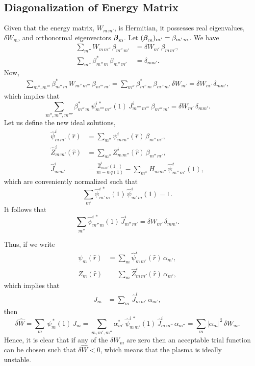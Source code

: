 \documentclass[12pt,prb,aps,notitlepage]{revtex4-1}
\newcommand{\bbeta}{\mbox{\boldmath$\beta$}}
\begin{document}
\subsection{Diagonalization of Energy Matrix}
Given that the energy matrix, $W_{m\,m'}$, is Hermitian, it possesses real eigenvalues, $\delta W_m$, and orthonormal
eigenvectors $\bbeta_m$. Let $(\bbeta_m)_{m'} = \beta_{m'\,m}$. 
We have
\begin{align}
\sum_{m''} W_{m\,m''}\,\beta_{m''\,m'} &= \delta W_{m'}\,\beta_{m\,m'},\\[0.5ex]
\sum_{m''} \beta_{m''\,m}^\ast\,\beta_{m''\,m'} &= \delta_{mm'}.
\end{align}
Now,
\begin{align}
\sum_{m'',m'''}\beta^\ast_{m''\,m}\,W_{m''\,m'''}\,\beta_{m'''\,m'} = \sum_{m''} \beta^\ast_{m''\,m}\,\beta_{m''\,m'}\,\delta W_{m'}=\delta W_{m'}\,\delta_{mm'},
\end{align}
which implies that 
\begin{equation}
\sum_{m'',m''',m''''}\beta^\ast_{m''\,m}\,\psi^{i\,\ast}_{m''''\,m''}(1)\,J^i_{m''''\,m'''}\,\beta_{m'''\,m'} = \delta W_{m'}\,\delta_{mm'}.
\end{equation}
Let us define the new ideal solutions, 
\begin{align}
\hat{\psi}^i_{m\,m'}(\hat{r}) &= \sum_{m''}\psi^i_{m\,m''}(\hat{r})\,\beta_{m''\,m'},\\[0.5ex]
\hat{Z}^i_{m\,m'}(\hat{r}) &= \sum_{m''}Z^i_{m\,m''}(\hat{r})\,\beta_{m''\,m'},\\[0.5ex]
\hat{J}^i_{m\,m'} &=  \frac{\hat{Z}_{m\,m'}^i(1_-)}{m-n\,q(1)}-\sum_{m''} H_{m\,m''}\,\hat{\psi}_{m''\,m'}^i(1),
\end{align}
which are conveniently normalized such that 
\begin{equation}
\sum_{m'}\hat{\psi}_{m'\,m}^{i\,\ast}(1)\,\hat{\psi}_{m'\,m}^i(1) = 1.
\end{equation}
It follows that
\begin{equation}
\sum_{m''} \hat{\psi}^{i\,\ast}_{m''\,m}(1)\,\hat{J}^i_{m''\,m'} = \delta W_{m'}\,\delta_{mm'}.
\end{equation}

Thus, if we write
\begin{align}
\psi_m(\hat{r}) &=\sum_m \hat{\psi}_{m\,m'}^i(\hat{r})\,\alpha_{m'},\\[0.5ex]
Z_m(\hat{r}) &=\sum_m \hat{Z}_{m\,m'}^i(\hat{r})\,\alpha_{m'},
\end{align}
which implies that
\begin{align}
J_m &= \sum_m\,\hat{J}_{m\,m'}^i\,\alpha_{m'},
\end{align}
then
\begin{equation}
\delta\hat{W} = \sum_{m}\,\psi_m^{\,\ast}(1)\,J_m=\sum_{m,m',m''}\alpha_{m'}^\ast\,\hat{\psi}_{m\,m'}^{i\,\ast}(1)\,\hat{J}_{m\,m''}^i\,\alpha_{m''}
=\sum_m |\alpha_m|^2\,\delta W_m.
\end{equation}
Hence, it is clear that if any of the $\delta W_m$ are zero then an acceptable trial function can be chosen such that $\delta \hat{W}<0$, which
means that the plasma is ideally unstable. 
\end{document}
